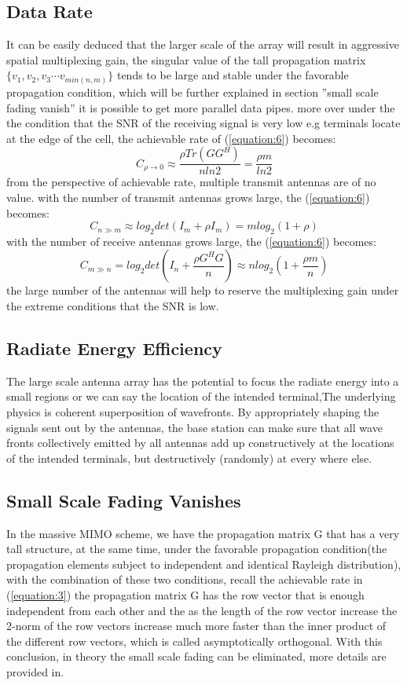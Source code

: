 \documentclass[conference]{IEEEtran}
\begin{document}
\subsection{Data Rate}
It can be easily deduced that the larger scale of the array will result in aggressive spatial multiplexing gain, the singular value of the tall propagation matrix $\{v_1,v_2,v_3\cdots v_{min(n,m)}\}$ tends to be large and stable under the favorable propagation condition, which will be further explained in section ''small scale fading vanish'' it is possible to get more parallel data pipes. more over under the the condition that the SNR of the receiving signal is very low e.g terminals locate at the edge of the cell, the achievable rate of (\ref{equation:6}) becomes:
\begin{equation}
C_{\rho\to 0}\approx\frac{\rho Tr(GG^H)}{nln2}=\frac{\rho m}{ln2} \label{equation:8}
\end{equation}
from the perspective of achievable rate, multiple transmit antennas are of no value.
with the number of transmit antennas grows large, the (\ref{equation:6}) becomes:
\begin{equation}
C_{n\gg m}\approx log_2det(I_m+\rho I_m)=mlog_2(1+\rho)\label{equation:9}
\end{equation}
with the number of receive antennas grows large, the (\ref{equation:6}) becomes:
\begin{equation}
C_{m\gg n}=log_2det(I_n+\frac{\rho G^HG}{n})\approx nlog_2(1+\frac{\rho m}{n})
\end{equation}\label{equation:10}
the large number of the antennas will help to reserve the multiplexing gain under the extreme conditions that the SNR is low.
\subsection{Radiate Energy Efficiency}
The large scale antenna array has the potential to focus the radiate energy into a small regions or we can say the location of the intended terminal,The underlying physics is coherent superposition of wavefronts. By appropriately shaping the signals sent out by the antennas, the base station can make sure that all wave fronts collectively emitted by all antennas add up constructively at the locations of the intended terminals, but destructively (randomly) at every where else.\newline
\subsection{Small Scale Fading Vanishes}
In the massive MIMO scheme, we have the propagation matrix G that has a very tall structure, at the same time, under the favorable propagation condition\cite{8}(the propagation elements subject to independent and identical Rayleigh distribution), with the combination of these two conditions, recall the achievable rate in (\ref{equation:3}) the propagation matrix G has the row vector that is enough independent from each other and the as the length of the row vector increase the 2-norm of the row vectors increase much more faster than the inner product of the different row vectors, which is called asymptotically orthogonal. With this conclusion, in theory the small scale fading can be eliminated, more details are provided in\cite{7}.
\end{document}
